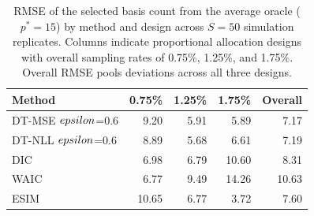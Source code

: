 \begin{table}[ht]
\centering
\begin{tabular}{l rrrr}
  \toprule
  Method & 0.75\% & 1.25\% & 1.75\% & Overall \\
  \midrule
  DT-MSE $\\epsilon$=0.6 & 9.20 & 5.91 & 5.89 & 7.17 \\
  DT-NLL $\\epsilon$=0.6 & 8.89 & 5.68 & 6.61 & 7.19 \\
  DIC & 6.98 & 6.79 & 10.60 & 8.31 \\
  WAIC & 6.77 & 9.49 & 14.26 & 10.63 \\
  ESIM & 10.65 & 6.77 & 3.72 & 7.60 \\
  \bottomrule
\end{tabular}
\caption{RMSE of the selected basis count from the average oracle ($p^* = 15$) by method and design across $S=50$ simulation replicates. Columns indicate proportional allocation designs with overall sampling rates of 0.75\%, 1.25\%, and 1.75\%. Overall RMSE pools deviations across all three designs.}
\label{tab:comparison}
\end{table}
